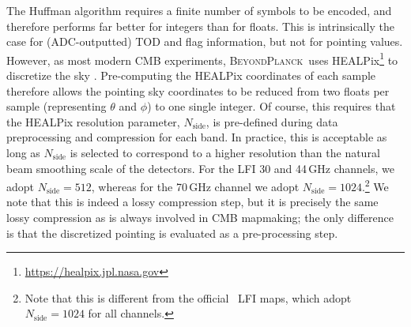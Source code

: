 \documentclass[twocolumn]{aa}
\newcommand{\BP}{\textsc{BeyondPlanck}}
\begin{document}
The Huffman algorithm requires a finite number of symbols to be
encoded, and therefore performs far better for integers than for
floats. This is intrinsically the case for (ADC-outputted) TOD and
flag information, but not for pointing values. However, as most modern
CMB experiments, \BP\ uses
HEALPix\footnote{\url{https://healpix.jpl.nasa.gov}} to discretize the
sky \citep{healpix}. Pre-computing the HEALPix coordinates of each
sample therefore allows the pointing sky coordinates to be reduced
from two floats per sample (representing $\theta$ and $\phi$) to one
single integer. Of course, this requires that the HEALPix resolution
parameter, $N_{\mathrm{side}}$, is pre-defined during data
preprocessing and compression for each band. In practice, this is
acceptable as long as $N_{\mathrm{side}}$ is selected to correspond to
a higher resolution than the natural beam smoothing scale of the
detectors. For the LFI 30 and 44\,GHz channels, we adopt
$N_{\mathrm{side}}=512$, whereas for the 70\,GHz channel we adopt
$N_{\mathrm{side}}=1024$.\footnote{Note that this is different from
  the official \Planck\ LFI maps, which adopt
  $N_{\mathrm{side}}=1024$ for all channels.} We note that this is
indeed a lossy compression step, but it is precisely the same lossy
compression as is always involved in CMB mapmaking; the only
difference is that the discretized pointing is evaluated as a
pre-processing step.
\end{document}
